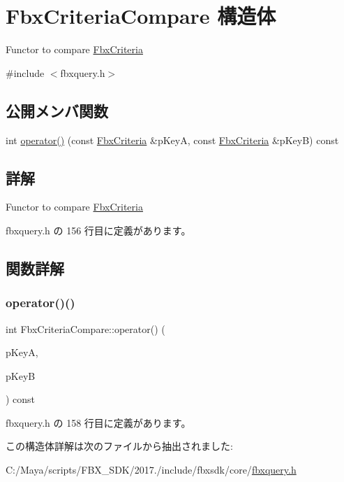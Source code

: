 \hypertarget{struct_fbx_criteria_compare}{}\section{Fbx\+Criteria\+Compare 構造体}
\label{struct_fbx_criteria_compare}


Functor to compare \hyperlink{class_fbx_criteria}{Fbx\+Criteria}  




{\ttfamily \#include $<$fbxquery.\+h$>$}

\subsection*{公開メンバ関数}
\begin{DoxyCompactItemize}
\item 
int \hyperlink{struct_fbx_criteria_compare_aa3ea695d11ec64d35f522007960f42b5}{operator()} (const \hyperlink{class_fbx_criteria}{Fbx\+Criteria} \&p\+KeyA, const \hyperlink{class_fbx_criteria}{Fbx\+Criteria} \&p\+KeyB) const
\end{DoxyCompactItemize}


\subsection{詳解}
Functor to compare \hyperlink{class_fbx_criteria}{Fbx\+Criteria} 

 fbxquery.\+h の 156 行目に定義があります。



\subsection{関数詳解}
\mbox{\label{struct_fbx_criteria_compare_aa3ea695d11ec64d35f522007960f42b5}} 
\subsubsection{\texorpdfstring{operator()()}{operator()()}}
{\footnotesize\ttfamily int Fbx\+Criteria\+Compare\+::operator() (\begin{DoxyParamCaption}\item[{const \hyperlink{class_fbx_criteria}{Fbx\+Criteria} \&}]{p\+KeyA,  }\item[{const \hyperlink{class_fbx_criteria}{Fbx\+Criteria} \&}]{p\+KeyB }\end{DoxyParamCaption}) const\hspace{0.3cm}{\ttfamily [inline]}}



 fbxquery.\+h の 158 行目に定義があります。



この構造体詳解は次のファイルから抽出されました\+:\begin{DoxyCompactItemize}
\item 
C\+:/\+Maya/scripts/\+F\+B\+X\+\_\+\+S\+D\+K/2017./include/fbxsdk/core/\hyperlink{fbxquery_8h}{fbxquery.\+h}\end{DoxyCompactItemize}

